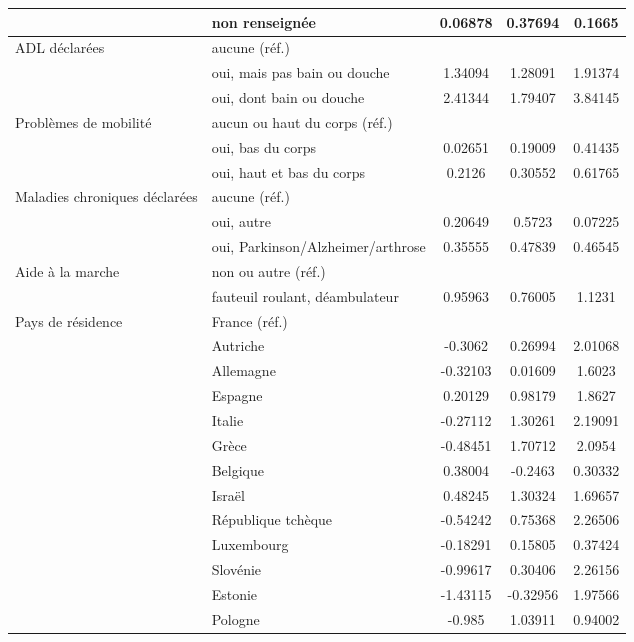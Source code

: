 \begin{Article}
\begin{refsection}[Bonnal]
\begin{table}
{\begin{tabular}{l@{\;}l@{\;} S!{\qquad}S!{\qquad}S!{\qquad}}
	& non renseignée & 0.06878 & 0.37694 & 0.1665 \\\hline
	ADL déclarées& aucune (réf.) &\sym{}&  \sym{}&\sym{} \\
	& oui, mais pas bain ou douche & 1.34094\sym{***} & 1.28091\sym{***} & 1.91374\sym{***} \\
	& oui, dont bain ou douche & 2.41344\sym{***} & 1.79407\sym{***} & 3.84145\sym{***} \\\hline
	Problèmes de mobilité& aucun ou haut du corps (réf.)&\sym{}&  \sym{}&\sym{} \\
	& oui, bas du corps & 0.02651 & 0.19009 & 0.41435\sym{**} \\
	& oui, haut et bas du corps & 0.2126 & 0.30552 & 0.61765\sym{***} \\\hline
	Maladies chroniques déclarées & aucune (réf.) &\sym{}&  \sym{}&\sym{} \\
	& oui, autre & 0.20649 & 0.5723 & 0.07225 \\
	& oui, Parkinson/Alzheimer/arthrose & 0.35555 & 0.47839 & 0.46545 \\\hline
	Aide à la marche & non ou autre (réf.) &\sym{}&  \sym{}&\sym{} \\
	& fauteuil roulant, déambulateur & 0.95963\sym{***} & 0.76005\sym{***} & 1.1231\sym{***} \\\hline
	Pays de résidence & France (réf.) &\sym{}&  \sym{}&\sym{} \\
	& Autriche & -0.3062 & 0.26994 & 2.01068\sym{***} \\
	& Allemagne & -0.32103 & 0.01609 & 1.6023\sym{***} \\
	& Espagne & 0.20129 & 0.98179\sym{***} & 1.8627\sym{***} \\
	& Italie & -0.27112 & 1.30261\sym{***} & 2.19091\sym{***} \\
	& Grèce & -0.48451\sym{*} & 1.70712\sym{***} & 2.0954\sym{***} \\
	& Belgique & 0.38004\sym{**} & -0.2463 & 0.30332 \\
	& Israël & 0.48245\sym{*} & 1.30324\sym{***} & 1.69657\sym{**} \\
	& République tchèque & -0.54242\sym{**} & 0.75368\sym{**} & 2.26506\sym{***} \\
	& Luxembourg & -0.18291 & 0.15805 & 0.37424 \\
	& Slovénie & -0.99617\sym{***} & 0.30406 & 2.26156\sym{***} \\
	& Estonie & -1.43115\sym{***} & -0.32956 & 1.97566\sym{***} \\
	& Pologne & -0.985\sym{***} & 1.03911\sym{*} & 0.94002 \\

\end{tabular}}
\end{table}
\end{refsection}
\end{Article}
